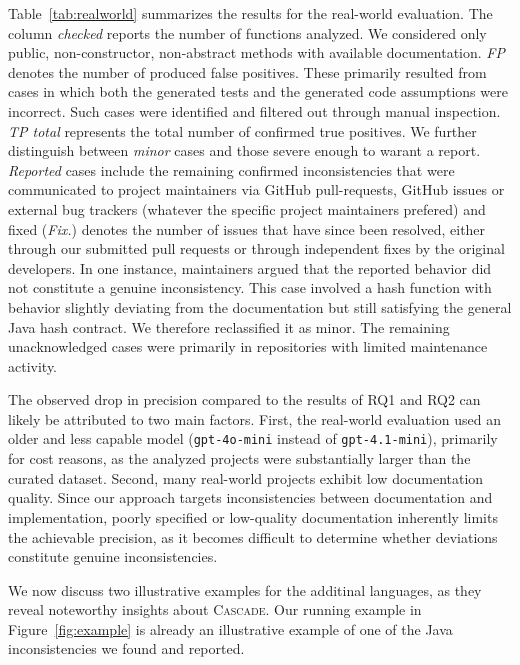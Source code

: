 \documentclass[acmsmall, screen]{acmart}
\newcommand{\tool}{\textsc{Cascade}\xspace}
\begin{document}
Table~\ref{tab:realworld} summarizes the results for the real-world evaluation. The column \textit{checked} reports the number of functions analyzed. We considered only public, non-constructor, non-abstract methods with available documentation.
\textit{FP} denotes the number of produced false positives. These primarily resulted from cases in which both the generated tests and the generated code assumptions were incorrect. Such cases were identified and filtered out through manual inspection.
\textit{TP total} represents the total number of confirmed true positives. We further distinguish between \textit{minor} cases and those severe enough to warant a report. \textit{Reported} cases include the remaining confirmed inconsistencies that were communicated to project maintainers via GitHub pull-requests, GitHub issues or external bug trackers (whatever the specific project maintainers prefered) and fixed (\textit{Fix.}) denotes the number of issues that have since been resolved, either through our submitted pull requests or through independent fixes by the original developers.
In one instance, maintainers argued that the reported behavior did not constitute a genuine inconsistency. This case involved a hash function with behavior slightly deviating from the documentation but still satisfying the general Java hash contract. We therefore reclassified it as minor. The remaining unacknowledged cases were primarily in repositories with limited maintenance activity.


The observed drop in precision compared to the results of RQ1 and RQ2 can likely be attributed to two main factors. First, the real-world evaluation used an older and less capable model (\texttt{gpt-4o-mini} instead of \texttt{gpt-4.1-mini}), primarily for cost reasons, as the analyzed projects were substantially larger than the curated dataset.
Second, many real-world projects exhibit low documentation quality. Since our approach targets inconsistencies between documentation and implementation, poorly specified or low-quality documentation inherently limits the achievable precision, as it becomes difficult to determine whether deviations constitute genuine inconsistencies.

We now discuss two illustrative examples for the additinal languages, as they reveal noteworthy insights about \tool. Our running example in Figure~\ref{fig:example} is already an illustrative example of one of the Java inconsistencies we found and reported.
\end{document}
